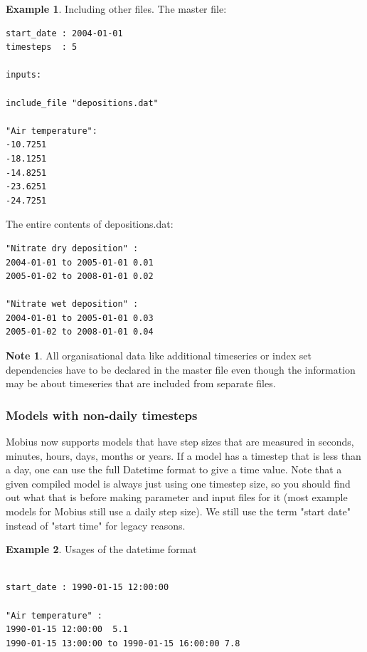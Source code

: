 \documentclass[11pt]{article}
\theoremstyle{definition}
\newtheorem{mynote}{Note}
\newenvironment{note}%
  {\begin{lrbox}{\notebox}%
   \begin{minipage}{\dimexpr\linewidth-2\fboxsep}
   \begin{mynote}}%
  {\end{mynote}%
   \end{minipage}%
   \end{lrbox}%
   \begin{trivlist}
     \item[]\colorbox{silver}{\usebox\notebox}
   \end{trivlist}}
\newtheorem{myexample}{Example}
\newenvironment{example}%
  {\begin{lrbox}{\examplebox}%
   \begin{minipage}{\dimexpr\linewidth-2\fboxsep}
   \begin{myexample}}%
  {\end{myexample}%
   \end{minipage}%
   \end{lrbox}%
   \begin{trivlist}
     \item[]\colorbox{silver}{\usebox\examplebox}
   \end{trivlist}}
\begin{document}
\begin{example}
Including other files. The master file:
\begin{lstlisting}
start_date : 2004-01-01
timesteps  : 5

inputs:

include_file "depositions.dat"

"Air temperature":
-10.7251
-18.1251
-14.8251
-23.6251
-24.7251
\end{lstlisting}
The entire contents of depositions.dat:
\begin{lstlisting}
"Nitrate dry deposition" :
2004-01-01 to 2005-01-01 0.01
2005-01-02 to 2008-01-01 0.02

"Nitrate wet deposition" :
2004-01-01 to 2005-01-01 0.03
2005-01-02 to 2008-01-01 0.04
\end{lstlisting}
\end{example}

\begin{note}
All organisational data like additional timeseries or index set dependencies have to be declared in the master file even though the information may be about timeseries that are included from separate files.
\end{note}

\subsubsection{Models with non-daily timesteps}

Mobius now supports models that have step sizes that are measured in seconds, minutes, hours, days, months or years. If a model has a timestep that is less than a day, one can use the full Datetime format to give a time value. Note that a given compiled model is always just using one timestep size, so you should find out what that is before making parameter and input files for it (most example models for Mobius still use a daily step size). We still use the term "start date" instead of "start time" for legacy reasons.

\begin{example}
Usages of the datetime format
\begin{lstlisting}

start_date : 1990-01-15 12:00:00

"Air temperature" :
1990-01-15 12:00:00  5.1
1990-01-15 13:00:00 to 1990-01-15 16:00:00 7.8
\end{lstlisting}
\end{example}
\end{document}
